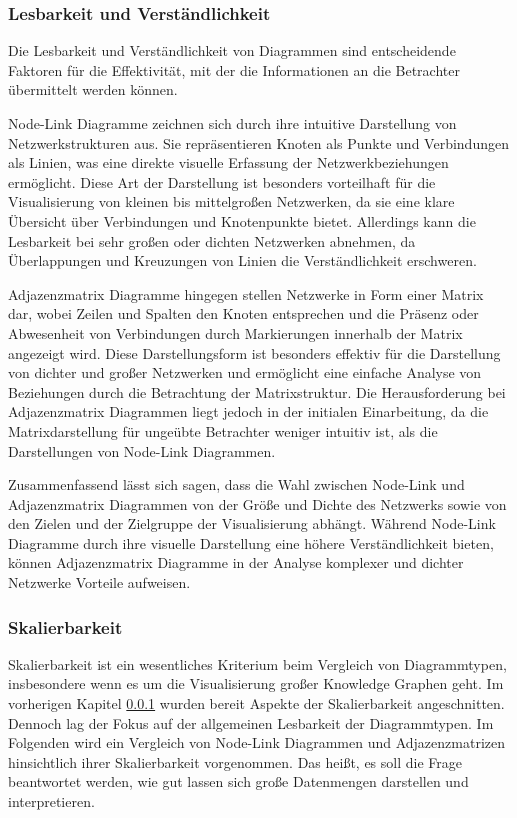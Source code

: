\subsubsection{Lesbarkeit und Verständlichkeit}
\label{theory:visualization:comparison:readability}

Die Lesbarkeit und Verständlichkeit von Diagrammen sind entscheidende Faktoren für die Effektivität, mit der die Informationen an die Betrachter übermittelt werden können.

Node-Link Diagramme zeichnen sich durch ihre intuitive Darstellung von Netzwerkstrukturen aus. Sie repräsentieren Knoten als Punkte und Verbindungen als Linien, was eine direkte visuelle Erfassung der Netzwerkbeziehungen ermöglicht. Diese Art der Darstellung ist besonders vorteilhaft für die Visualisierung von kleinen bis mittelgroßen Netzwerken, da sie eine klare Übersicht über Verbindungen und Knotenpunkte bietet. Allerdings kann die Lesbarkeit bei sehr großen oder dichten Netzwerken abnehmen, da Überlappungen und Kreuzungen von Linien die Verständlichkeit erschweren.

Adjazenzmatrix Diagramme hingegen stellen Netzwerke in Form einer Matrix dar, wobei Zeilen und Spalten den Knoten entsprechen und die Präsenz oder Abwesenheit von Verbindungen durch Markierungen innerhalb der Matrix angezeigt wird. Diese Darstellungsform ist besonders effektiv für die Darstellung von dichter und großer Netzwerken und ermöglicht eine einfache Analyse von Beziehungen durch die Betrachtung der Matrixstruktur. Die Herausforderung bei Adjazenzmatrix Diagrammen liegt jedoch in der initialen Einarbeitung, da die Matrixdarstellung für ungeübte Betrachter weniger intuitiv ist, als die Darstellungen von Node-Link Diagrammen.

Zusammenfassend lässt sich sagen, dass die Wahl zwischen Node-Link und Adjazenzmatrix Diagrammen von der Größe und Dichte des Netzwerks sowie von den Zielen und der Zielgruppe der Visualisierung abhängt. Während Node-Link Diagramme durch ihre visuelle Darstellung eine höhere Verständlichkeit bieten, können Adjazenzmatrix Diagramme in der Analyse komplexer und dichter Netzwerke Vorteile aufweisen.

\subsubsection{Skalierbarkeit}
\label{theory:visualization:comparison:scalability}

Skalierbarkeit ist ein wesentliches Kriterium beim Vergleich von Diagrammtypen, insbesondere wenn es um die Visualisierung großer Knowledge Graphen geht. Im vorherigen Kapitel \ref{theory:visualization:comparison:readability} wurden bereit Aspekte der Skalierbarkeit angeschnitten. Dennoch lag der Fokus auf der allgemeinen Lesbarkeit der Diagrammtypen. Im Folgenden wird ein Vergleich von Node-Link Diagrammen und Adjazenzmatrizen hinsichtlich ihrer Skalierbarkeit vorgenommen. Das heißt, es soll die Frage beantwortet werden, wie gut lassen sich große Datenmengen darstellen und interpretieren.

